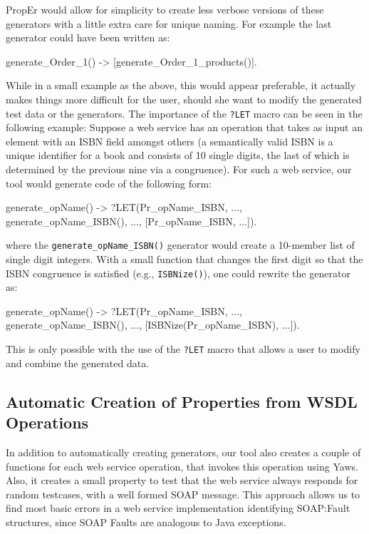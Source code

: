 \documentclass[submission,copyright]{eptcs}
\newcommand{\LET}{\texttt{?LET}\xspace}
\begin{document}
PropEr would allow for simplicity to create less verbose versions of
these generators with a little extra care for unique naming. For
example the last generator could have been written as:

\begin{lsterlang}[firstnumber=35]
generate_Order_1() ->
  [generate_Order_1_products()].
\end{lsterlang}

While in a small example as the above, this would appear preferable,
it actually makes things more difficult for the user, should she want
to modify the generated test data or the generators. The importance of
the \LET macro can be seen in the following example: Suppose a web
service has an operation that takes as input an element with an ISBN
field amongst others (a semantically valid ISBN is a unique identifier
for a book and consists of 10 single digits, the last of which is
determined by the previous nine via a congruence). For such a web
service, our tool would generate code of the following form:
\begin{lsterlang}[numbers=none]
generate_opName() ->
  ?LET({Pr_opName_ISBN, ...},
        {generate_opName_ISBN(), ...},
        [Pr_opName_ISBN, ...]).
\end{lsterlang}
where the \texttt{generate\_opName\_ISBN()} generator would create a
10-member list of single digit integers. With a small function that
changes the first digit so that the ISBN congruence is satisfied (e.g.,
\texttt{ISBNize()}), one could rewrite the generator as:
\begin{lsterlang}[numbers=none]
generate_opName() ->
  ?LET({Pr_opName_ISBN, ...},
        {generate_opName_ISBN(), ...},
        [ISBNize(Pr_opName_ISBN), ...]).
\end{lsterlang}
This is only possible with the use of the \LET macro that allows a user to
modify and combine the generated data. 

\subsection{Automatic Creation of Properties from WSDL Operations}

In addition to automatically creating generators, our tool also
creates a couple of functions for each web service operation, that
invokes this operation using Yaws. Also, it creates a small property
to test that the web service always responds for random testcases, with a
well formed SOAP message. This approach allows us to find most basic
errors in a web service implementation identifying SOAP:Fault
structures, since SOAP Faults are analogous to Java exceptions.
\end{document}

